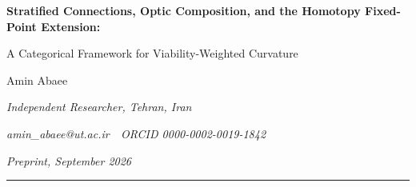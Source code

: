 \documentclass[11pt,a4paper]{article}
\theoremstyle{plain}
\theoremstyle{definition}
\theoremstyle{remark}
\begin{document}
\begin{center}
  \vspace*{0.4em}
  {\large\bfseries Stratified Connections, Optic Composition, and the
   Homotopy Fixed-Point Extension:\par
   A Categorical Framework for Viability-Weighted Curvature\par}
  \vspace{0.8em}
  {\normalsize Amin Abaee\par}
  \vspace{0.3em}
  {\small\itshape Independent Researcher, Tehran, Iran\par}
  {\small\itshape amin\_abaee@ut.ac.ir\ \textbullet\ ORCID 0000-0002-0019-1842\par}
  \vspace{0.2em}
  {\small\itshape Preprint, September 2026\par}
  \vspace{0.6em}
  \rule{0.7\textwidth}{0.4pt}
\end{center}
\end{document}
